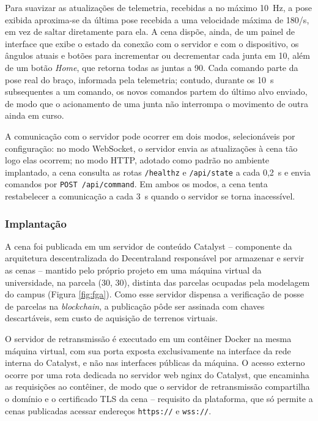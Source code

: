 \documentclass[12pt]{article}
\begin{document}
Para suavizar as atualizações de telemetria, recebidas a no máximo 10~Hz, a pose exibida aproxima-se da última pose recebida a uma velocidade máxima de 180\textdegree/s, em vez de saltar diretamente para ela. A cena dispõe, ainda, de um painel de interface que exibe o estado da conexão com o servidor e com o dispositivo, os ângulos atuais e botões para incrementar ou decrementar cada junta em 10\textdegree, além de um botão \textit{Home}, que retorna todas as juntas a 90\textdegree. Cada comando parte da pose real do braço, informada pela telemetria; contudo, durante os 10~s subsequentes a um comando, os novos comandos partem do último alvo enviado, de modo que o acionamento de uma junta não interrompa o movimento de outra ainda em curso.

A comunicação com o servidor pode ocorrer em dois modos, selecionáveis por configuração: no modo WebSocket, o servidor envia as atualizações à cena tão logo elas ocorrem; no modo HTTP, adotado como padrão no ambiente implantado, a cena consulta as rotas \texttt{/healthz} e \texttt{/api/state} a cada 0,2~s e envia comandos por \texttt{POST /api/command}. Em ambos os modos, a cena tenta restabelecer a comunicação a cada 3~s quando o servidor se torna inacessível.

\subsubsection{Implantação}
\label{subsec:implantacao}

A cena foi publicada em um servidor de conteúdo Catalyst -- componente da arquitetura descentralizada do Decentraland responsável por armazenar e servir as cenas -- mantido pelo próprio projeto em uma máquina virtual da universidade, na parcela (30, 30), distinta das parcelas ocupadas pela modelagem do campus (Figura \ref{fig:fga}). Como esse servidor dispensa a verificação de posse de parcelas na \textit{blockchain}, a publicação pôde ser assinada com chaves descartáveis, sem custo de aquisição de terrenos virtuais.

O servidor de retransmissão é executado em um contêiner Docker na mesma máquina virtual, com sua porta exposta exclusivamente na interface da rede interna do Catalyst, e não nas interfaces públicas da máquina. O acesso externo ocorre por uma rota dedicada no servidor web nginx do Catalyst, que encaminha as requisições ao contêiner, de modo que o servidor de retransmissão compartilha o domínio e o certificado TLS da cena -- requisito da plataforma, que só permite a cenas publicadas acessar endereços \texttt{https://} e \texttt{wss://}.
\end{document}
